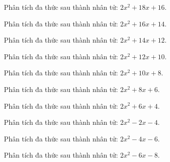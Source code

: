 \begin{bt}
	Phân tích đa thức sau thành nhân tử: $2 x^2 + 18 x + 16$.
\end{bt}
\begin{bt}
	Phân tích đa thức sau thành nhân tử: $2 x^2 + 16 x + 14$.
\end{bt}
\begin{bt}
	Phân tích đa thức sau thành nhân tử: $2 x^2 + 14 x + 12$.
\end{bt}
\begin{bt}
	Phân tích đa thức sau thành nhân tử: $2 x^2 + 12 x + 10$.
\end{bt}
\begin{bt}
	Phân tích đa thức sau thành nhân tử: $2 x^2 + 10 x + 8$.
\end{bt}
\begin{bt}
	Phân tích đa thức sau thành nhân tử: $2 x^2 + 8 x + 6$.
\end{bt}
\begin{bt}
	Phân tích đa thức sau thành nhân tử: $2 x^2 + 6 x + 4$.
\end{bt}
\begin{bt}
	Phân tích đa thức sau thành nhân tử: $2 x^2 - 2 x - 4$.
\end{bt}
\begin{bt}
	Phân tích đa thức sau thành nhân tử: $2 x^2 - 4 x - 6$.
\end{bt}
\begin{bt}
	Phân tích đa thức sau thành nhân tử: $2 x^2 - 6 x - 8$.
\end{bt}
